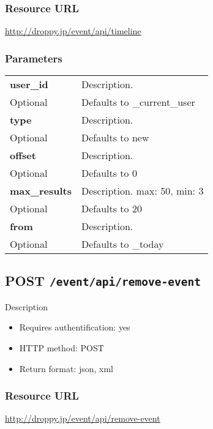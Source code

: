 \documentclass[11pt,a4paper]{article}
\newcommand{\content}[1]{\begin{minipage}{10cm}\vspace{2mm}#1\vspace{2mm}\end{minipage}}
\begin{document}
  \subsubsection*{Resource URL}
  \url{http://droppy.jp/event/api/timeline}
  \subsubsection*{Parameters}
  \begin{table}[h]
    \begin{center}
      \begin{tabular}{l l}
        \hline 
      \textbf{user\_id} & \content{Description. }
      \\
      Optional & Defaults to \_current\_user\\
      \hline
      \textbf{type} & \content{Description. }
      \\
      Optional & Defaults to new\\
      \hline
      \textbf{offset} & \content{Description. }
      \\
      Optional & Defaults to 0\\
      \hline
      \textbf{max\_results} & \content{Description. max: 50, min: 3}
      \\
      Optional & Defaults to 20\\
      \hline
      \textbf{from} & \content{Description. }
      \\
      Optional & Defaults to \_today\\
      \hline
      \end{tabular}
    \end{center}
  \end{table}
  
      \newpage
      
      
  \subsection*{POST {\tt /event/api/remove-event}}
  Description
  \begin{itemize}
  \item Requires authentification: yes
  \item HTTP method: POST
  \item Return format: json, xml
  \end{itemize}
  \subsubsection*{Resource URL}
  \url{http://droppy.jp/event/api/remove-event}
\end{document}
